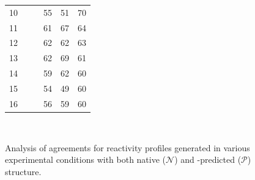 \documentclass[11pt]{article} %
\begin{document}
\begin{figure}[t!]
{{\begin{tabular}{@{}lllHHS}
			10  &  & \CMCTMg            & 55                                   & 51                                   & 70                            \\
			11  &  & \OneMSevILUThree   & 61                                   & 67                                   & 64                            \\
			12  &  & \DMSMg             & 62                                   & 62                                   & 63                            \\
			13  &  & \NMIACE            & 62                                   & 69                                   & 61                            \\
			14  &  & \OneMSevCE         & 59                                   & 62                                   & 60                            \\
			15  &  & \BzCN              & 54                                   & 49                                   & 60                            \\
			16  &  & \NAICE             & 56                                   & 59                                   & 60                            \\ \bottomrule
		\end{tabular}}\\}
		
%		
	\caption{Analysis of agreements for reactivity profiles generated in various experimental conditions with both native ($\mathcal{N}$) and \OurTool{}-predicted ($\mathcal{P}$) structure.\label{tab:experiment_agreement}}
\end{figure}
\end{document}
